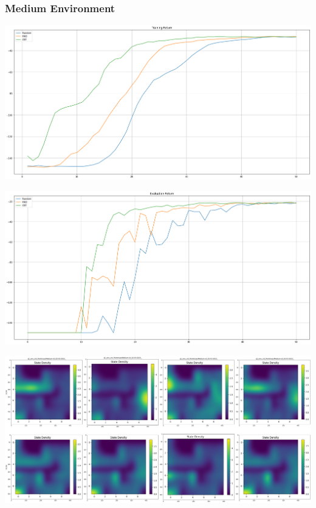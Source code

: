 \documentclass[11pt]{article}
\begin{document}
    \subsubsection{Medium Environment}

    \hspace*{-0.3in}
    \includegraphics[scale=0.30]{p1/q1-p2-cnt-medium-train}

    \hspace*{-0.6in}
    \includegraphics[scale=0.30]{p1/q1-p2-cnt-medium-eval}

    \hspace*{-0.6in}
    \includegraphics[scale=0.2]{p1/q1-p2-cnt-medium-state-density}
\end{document}
